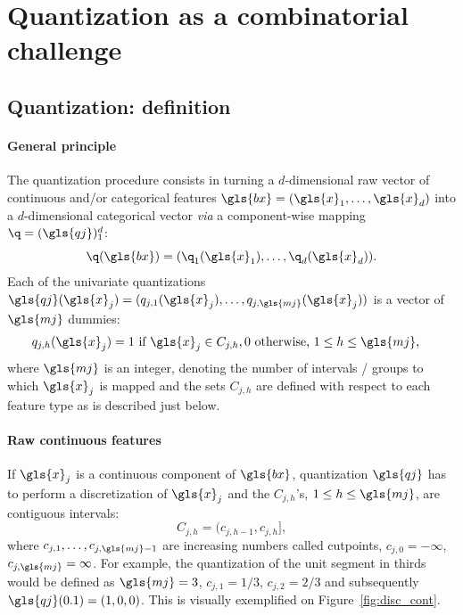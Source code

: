  
\section{Quantization as a combinatorial challenge} \label{sec:model_selection}

\subsection{Quantization: definition}

\paragraph{General principle}

The quantization procedure consists in turning a $d$-dimensional raw vector of continuous and/or categorical features $\gls{bx} = (\gls{x}_1, \ldots, \gls{x}_d)$ into a $d$-dimensional categorical vector \textit{via} a component-wise mapping $\q=(\gls{qj})_1^d$:
\[\q(\gls{bx})=(\q_1(\gls{x}_1),\ldots,\q_d(\gls{x}_d)).\]
Each of the univariate quantizations $\gls{qj}(\gls{x}_j) = (q_{j,1}(\gls{x}_j), \dots, q_{j,\gls{mj}}(\gls{x}_j))$ is a vector of $\gls{mj}$ dummies: 
\begin{align}\label{eq:qj}
& q_{j,h}(\gls{x}_j) =  1 \text{ if } \gls{x}_j \in C_{j,h}, 0 \text{ otherwise, } 1 \leq h \leq \gls{mj},
\end{align}
where $\gls{mj}$ is an integer, denoting the number of intervals / groups to which $\gls{x}_j$ is mapped
and the sets $C_{j,h}$ are defined with respect to each feature type as is described just below.
\paragraph{Raw continuous features} If $\gls{x}_j$ is a continuous component of $\gls{bx}$, quantization $\gls{qj}$ has to perform a discretization of $\gls{x}_j$ and the $C_{j,h}$'s, $1 \leq h \leq \gls{mj}$, are contiguous intervals:
\begin{equation}\label{eq:Cjhcont}
C_{j,h}=(c_{j,h-1},c_{j,h}],
\end{equation}
where $c_{j,1},\ldots,c_{j,\gls{mj}-1}$ are increasing numbers called cutpoints, $c_{j,0}=-\infty$, $c_{j,\gls{mj}}=\infty$. For example, the quantization of the unit segment in thirds would be defined as $\gls{mj}=3$, $c_{j,1} = 1/3$, $c_{j,2} = 2/3$ and subsequently $\gls{qj}(0.1) = (1,0,0)$. This is visually exemplified on Figure~\ref{fig:disc_cont}.
